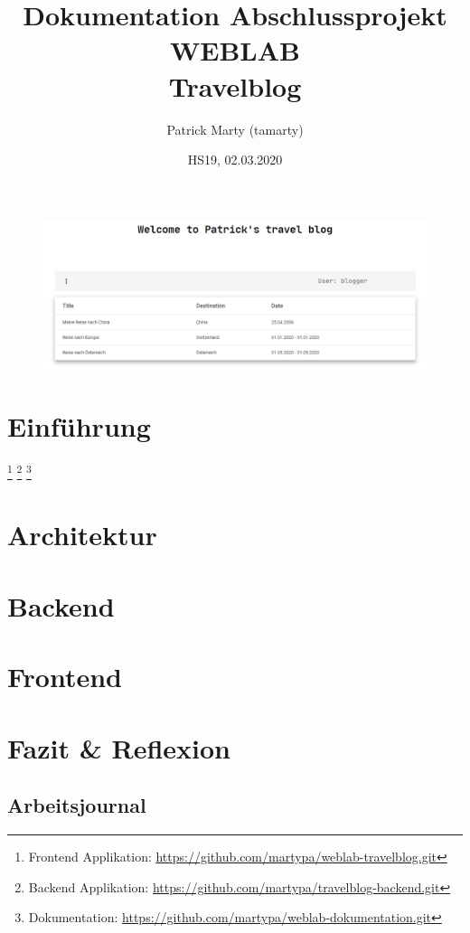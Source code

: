 \documentclass{article}
\title{Dokumentation Abschlussprojekt WEBLAB \\
        \textbf{Travelblog}}
\author{Patrick Marty (tamarty)}
\date{HS19, 02.03.2020}
\begin{document}
\maketitle


\vspace{2cm}
\begin{figure}[h]
        \centering
        \includegraphics[width=1\textwidth]{blogDashboard.png}
\end{figure}

\vspace{1cm}

\section{Einführung}\label{einfuhrung}

\footnote{Frontend Applikation: \url{https://github.com/martypa/weblab-travelblog.git}}
\footnote{Backend Applikation:  \url{https://github.com/martypa/travelblog-backend.git}}
\footnote{Dokumentation:        \url{https://github.com/martypa/weblab-dokumentation.git}}
\newpage

\section{Architektur}\label{architektur}


\vspace{2cm}
\section{Backend}\label{backend}


\section{Frontend}\label{frontend}


\section{Fazit \& Reflexion}\label{fazit}

\newpage

\begin{landscape}
\section{Arbeitsjournal}\label{arbeitsjournal}

\end{landscape}
\end{document}
